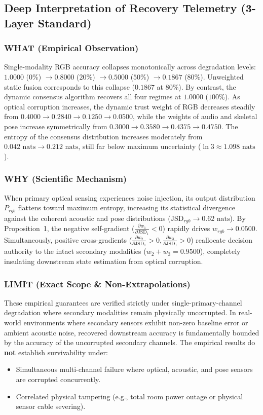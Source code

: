 \documentclass[conference]{IEEEtran}
\begin{document}
\subsection{Deep Interpretation of Recovery Telemetry (3-Layer Standard)}
\subsubsection{WHAT (Empirical Observation)}
Single-modality RGB accuracy collapses monotonically across degradation levels: $1.0000$ ($0\%$) $\to 0.8000$ ($20\%$) $\to 0.5000$ ($50\%$) $\to 0.1867$ ($80\%$). Unweighted static fusion corresponds to this collapse ($0.1867$ at $80\%$). By contrast, the dynamic consensus algorithm recovers all four regimes at $1.0000$ ($100\%$). As optical corruption increases, the dynamic trust weight of RGB decreases steadily from $0.4000 \to 0.2840 \to 0.1250 \to 0.0500$, while the weights of audio and skeletal pose increase symmetrically from $0.3000 \to 0.3580 \to 0.4375 \to 0.4750$. The entropy of the consensus distribution increases moderately from $0.042\text{ nats} \to 0.212\text{ nats}$, still far below maximum uncertainty ($\ln 3 \approx 1.098\text{ nats}$).

\subsubsection{WHY (Scientific Mechanism)}
When primary optical sensing experiences noise injection, its output distribution $P_{rgb}$ flattens toward maximum entropy, increasing its statistical divergence against the coherent acoustic and pose distributions ($\mathrm{JSD}_{rgb} \to 0.62\text{ nats}$). By Proposition~1, the negative self-gradient ($\frac{\partial w_1}{\partial \mathrm{JSD}_1} < 0$) rapidly drives $w_{rgb} \to 0.0500$. Simultaneously, positive cross-gradients ($\frac{\partial w_2}{\partial \mathrm{JSD}_1} > 0, \frac{\partial w_3}{\partial \mathrm{JSD}_1} > 0$) reallocate decision authority to the intact secondary modalities ($w_2 + w_3 = 0.9500$), completely insulating downstream state estimation from optical corruption.

\subsubsection{LIMIT (Exact Scope \& Non-Extrapolations)}
These empirical guarantees are verified strictly under single-primary-channel degradation where secondary modalities remain physically uncorrupted. In real-world environments where secondary sensors exhibit non-zero baseline error or ambient acoustic noise, recovered downstream accuracy is fundamentally bounded by the accuracy of the uncorrupted secondary channels. The empirical results do \textbf{not} establish survivability under:
\begin{itemize}
    \item Simultaneous multi-channel failure where optical, acoustic, and pose sensors are corrupted concurrently.
    \item Correlated physical tampering (e.g., total room power outage or physical sensor cable severing).
\end{itemize}
\end{document}
